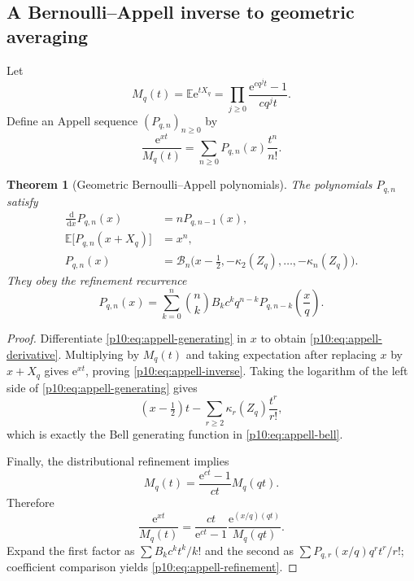 \documentclass[11pt]{article}
\numberwithin{equation}{section}
\newtheorem{theorem}{Theorem}[section]
\theoremstyle{definition}
\theoremstyle{remark}
\newcommand{\E}{\mathbb E}
\newcommand{\dd}{\,\mathrm d}
\newcommand{\e}{\mathrm e}
\begin{document}
\subsection{A Bernoulli--Appell inverse to geometric averaging}

Let
\begin{equation}
 M_q(t)=\E\e^{tX_q}
 =\prod_{j\ge0}\frac{\e^{cq^jt}-1}{cq^jt}.                   \label{p10:eq:mgf-product}
\end{equation}
Define an Appell sequence $(P_{q,n})_{n\ge0}$ by
\begin{equation}
 \frac{\e^{xt}}{M_q(t)}
 =\sum_{n\ge0}P_{q,n}(x)\frac{t^n}{n!}.                     \label{p10:eq:appell-generating}
\end{equation}

\begin{theorem}[Geometric Bernoulli--Appell polynomials]
\label{p10:thm:appell}
The polynomials $P_{q,n}$ satisfy
\begin{align}
 \frac{\dd}{\dd x}P_{q,n}(x)&=nP_{q,n-1}(x),                 \label{p10:eq:appell-derivative}\\
 \E\bigl[P_{q,n}(x+X_q)\bigr]&=x^n,                         \label{p10:eq:appell-inverse}\\
 P_{q,n}(x)
 &=\mathcal B_n\bigl(x-\tfrac12,-\kappa_2(Z_q),\ldots,-\kappa_n(Z_q)\bigr). \label{p10:eq:appell-bell}
\end{align}
They obey the refinement recurrence
\begin{equation}
 \boxed{\displaystyle
 P_{q,n}(x)
 =\sum_{k=0}^{n}\binom nk B_k c^k q^{n-k}
 P_{q,n-k}\!\left(\frac{x}{q}\right).}                     \label{p10:eq:appell-refinement}
\end{equation}
\end{theorem}

\begin{proof}
Differentiate \eqref{p10:eq:appell-generating} in $x$ to obtain
\eqref{p10:eq:appell-derivative}.  Multiplying by $M_q(t)$ and taking expectation after replacing
$x$ by $x+X_q$ gives $\e^{xt}$, proving \eqref{p10:eq:appell-inverse}.  Taking the logarithm of
the left side of \eqref{p10:eq:appell-generating} gives
\[
 (x-\tfrac12)t-\sum_{r\ge2}\kappa_r(Z_q)\frac{t^r}{r!},
\]
which is exactly the Bell generating function in \eqref{p10:eq:appell-bell}.

Finally, the distributional refinement implies
\[
 M_q(t)=\frac{\e^{ct}-1}{ct}M_q(qt).
\]
Therefore
\[
 \frac{\e^{xt}}{M_q(t)}
 =\frac{ct}{\e^{ct}-1}
  \frac{\e^{(x/q)(qt)}}{M_q(qt)}.
\]
Expand the first factor as $\sum B_kc^kt^k/k!$ and the second as
$\sum P_{q,r}(x/q)q^rt^r/r!$; coefficient comparison yields
\eqref{p10:eq:appell-refinement}.
\end{proof}
\end{document}
